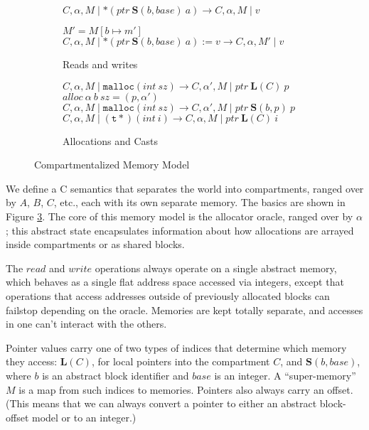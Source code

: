 \documentclass{article}
\begin{document}
\begin{figure}
\begin{subfigure}{0.55\textwidth}
             {\(C, \alpha, M \mid *(\mathit{ptr} ~ \mathbf{S}(b, \mathit{base}) ~ a)
               \longrightarrow C, \alpha, M \mid v\)}

                {\(M' = M[b \mapsto m']\)}
                {\(C, \alpha, M \mid *(\mathit{ptr} ~ \mathbf{S}(b, \mathit{base}) ~ a) := v
                  \longrightarrow C, \alpha, M' \mid v\)}

    \caption{Reads and writes}
    \label{subfig:rnw}
  \end{subfigure}
  \begin{subfigure}{\textwidth}
             {\(C, \alpha, M \mid \mathtt{malloc}(\mathit{int} ~ sz) \longrightarrow
               C, \alpha', M \mid \mathit{ptr} ~ \mathbf{L}(C) ~ p\)}
                {\(\mathit{alloc} ~ \alpha ~ b ~ sz = (p, \alpha')\)}
                {\(C, \alpha, M \mid \mathtt{malloc}(\mathit{int} ~ sz) \longrightarrow
                  C, \alpha', M \mid \mathit{ptr} ~ \mathbf{S}(b,p) ~ p\)}
    \judgment{}
             {\(C,\alpha,M \mid \mathtt{(t*)} (\mathit{int} ~ i) \longrightarrow
               C,\alpha,M \mid \mathit{ptr} ~ \mathbf{L}(C) ~ \mathit{i}\)}

    \caption{Allocations and Casts}
    \label{subfig:allocs}
  \end{subfigure}

  \caption{Compartmentalized Memory Model}
  \label{fig:memmod}
\end{figure}

We define a C semantics that separates the world into compartments, ranged over by
\(A\), \(B\), \(C\), etc., each with its own separate memory. The basics are shown in
Figure \ref{fig:memmod}. The core of this memory model is the allocator oracle, ranged
over by \(\alpha\); this abstract state encapsulates information about how allocations
are arrayed inside compartments or as shared blocks.

The \(\mathit{read}\) and \(\mathit{write}\) operations always operate on a single
abstract memory, which behaves as a single flat address space accessed via integers,
except that operations that access addresses outside of previously allocated blocks
can failstop depending on the oracle. Memories are kept totally separate, and accesses
in one can't interact with the others.

Pointer values carry one of two types of indices that determine which memory they access:
\(\mathbf{L}(C)\), for local pointers into the compartment \(C\), and
\(\mathbf{S}(b,\mathit{base})\), where \(b\) is an abstract block identifier and
\(\mathit{base}\) is an integer. A ``super-memory'' \(M\) is a map from such indices
to memories. Pointers also always carry an offset. (This means that we can always convert a
pointer to either an abstract block-offset model or to an integer.)
\end{document}
